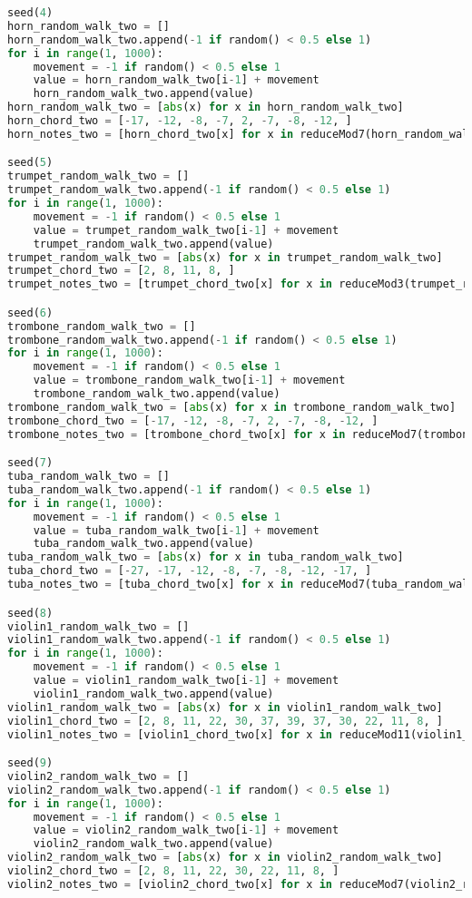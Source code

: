\begin{lstlisting}[language=Python, caption=Tianshu Segment\_III]
seed(4)
horn_random_walk_two = []
horn_random_walk_two.append(-1 if random() < 0.5 else 1)
for i in range(1, 1000):
    movement = -1 if random() < 0.5 else 1
    value = horn_random_walk_two[i-1] + movement
    horn_random_walk_two.append(value)
horn_random_walk_two = [abs(x) for x in horn_random_walk_two]
horn_chord_two = [-17, -12, -8, -7, 2, -7, -8, -12, ]
horn_notes_two = [horn_chord_two[x] for x in reduceMod7(horn_random_walk_two)]

seed(5)
trumpet_random_walk_two = []
trumpet_random_walk_two.append(-1 if random() < 0.5 else 1)
for i in range(1, 1000):
    movement = -1 if random() < 0.5 else 1
    value = trumpet_random_walk_two[i-1] + movement
    trumpet_random_walk_two.append(value)
trumpet_random_walk_two = [abs(x) for x in trumpet_random_walk_two]
trumpet_chord_two = [2, 8, 11, 8, ]
trumpet_notes_two = [trumpet_chord_two[x] for x in reduceMod3(trumpet_random_walk_two)]

seed(6)
trombone_random_walk_two = []
trombone_random_walk_two.append(-1 if random() < 0.5 else 1)
for i in range(1, 1000):
    movement = -1 if random() < 0.5 else 1
    value = trombone_random_walk_two[i-1] + movement
    trombone_random_walk_two.append(value)
trombone_random_walk_two = [abs(x) for x in trombone_random_walk_two]
trombone_chord_two = [-17, -12, -8, -7, 2, -7, -8, -12, ]
trombone_notes_two = [trombone_chord_two[x] for x in reduceMod7(trombone_random_walk_two)]

seed(7)
tuba_random_walk_two = []
tuba_random_walk_two.append(-1 if random() < 0.5 else 1)
for i in range(1, 1000):
    movement = -1 if random() < 0.5 else 1
    value = tuba_random_walk_two[i-1] + movement
    tuba_random_walk_two.append(value)
tuba_random_walk_two = [abs(x) for x in tuba_random_walk_two]
tuba_chord_two = [-27, -17, -12, -8, -7, -8, -12, -17, ]
tuba_notes_two = [tuba_chord_two[x] for x in reduceMod7(tuba_random_walk_two)]

seed(8)
violin1_random_walk_two = []
violin1_random_walk_two.append(-1 if random() < 0.5 else 1)
for i in range(1, 1000):
    movement = -1 if random() < 0.5 else 1
    value = violin1_random_walk_two[i-1] + movement
    violin1_random_walk_two.append(value)
violin1_random_walk_two = [abs(x) for x in violin1_random_walk_two]
violin1_chord_two = [2, 8, 11, 22, 30, 37, 39, 37, 30, 22, 11, 8, ]
violin1_notes_two = [violin1_chord_two[x] for x in reduceMod11(violin1_random_walk_two)]

seed(9)
violin2_random_walk_two = []
violin2_random_walk_two.append(-1 if random() < 0.5 else 1)
for i in range(1, 1000):
    movement = -1 if random() < 0.5 else 1
    value = violin2_random_walk_two[i-1] + movement
    violin2_random_walk_two.append(value)
violin2_random_walk_two = [abs(x) for x in violin2_random_walk_two]
violin2_chord_two = [2, 8, 11, 22, 30, 22, 11, 8, ]
violin2_notes_two = [violin2_chord_two[x] for x in reduceMod7(violin2_random_walk_two)]


\end{lstlisting}
